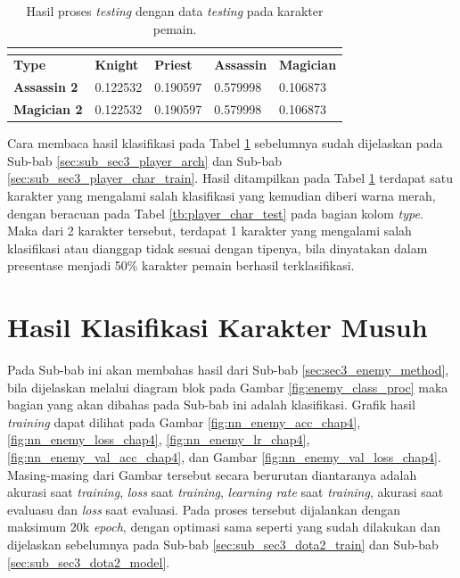 \begin{longtable}{|l|l|l|l|l|}
	\caption{Hasil proses \textit{testing} dengan data \textit{testing} pada karakter pemain.}
	\vspace{1ex}
	\label{tb:player_valid_result}\\
	\hline
	\rowcolor[HTML]{C0C0C0} 
	\textbf{Type} & \textbf{Knight} & \textbf{Priest} & \textbf{Assassin} & \textbf{Magician} \\ \hline
	\textbf{Assassin 2} & 0.122532 & 0.190597 & {\color[HTML]{009901} 0.579998} & 0.106873 \\ \hline
	\textbf{Magician 2} & 0.122532 & 0.190597 & {\color[HTML]{FE0000} 0.579998} & 0.106873 \\ \hline
\end{longtable}
\vspace{1ex}

Cara membaca hasil klasifikasi pada Tabel \ref{tb:player_valid_result} sebelumnya sudah dijelaskan pada Sub-bab \ref{sec:sub_sec3_player_arch} dan Sub-bab \ref{sec:sub_sec3_player_char_train}. Hasil ditampilkan pada Tabel \ref{tb:player_valid_result} terdapat satu karakter yang mengalami salah klasifikasi yang kemudian diberi warna merah, dengan beracuan pada Tabel \ref{tb:player_char_test} pada bagian kolom \textit{type}. Maka dari 2 karakter tersebut, terdapat 1 karakter yang mengalami salah klasifikasi atau dianggap tidak sesuai dengan tipenya, bila dinyatakan dalam presentase menjadi 50\% karakter pemain berhasil terklasifikasi.
\vspace{1ex}

\section{Hasil Klasifikasi Karakter Musuh}
\label{sec:sec4_eval_enemy}
\vspace{1ex}

Pada Sub-bab ini akan membahas hasil dari Sub-bab \ref{sec:sec3_enemy_method}, bila dijelaskan melalui diagram blok pada Gambar \ref{fig:enemy_class_proc} maka bagian yang akan dibahas pada Sub-bab ini adalah klasifikasi. Grafik hasil \textit{training} dapat dilihat pada Gambar \ref{fig:nn_enemy_acc_chap4}, \ref{fig:nn_enemy_loss_chap4}, \ref{fig:nn_enemy_lr_chap4}, \ref{fig:nn_enemy_val_acc_chap4}, dan Gambar \ref{fig:nn_enemy_val_loss_chap4}. Masing-masing dari Gambar tersebut secara berurutan diantaranya adalah akurasi saat \textit{training}, \textit{loss} saat \textit{training}, \textit{learning rate} saat \textit{training}, akurasi saat evaluasu dan \textit{loss} saat evaluasi. Pada proses tersebut dijalankan dengan maksimum 20k \textit{epoch}, dengan optimasi sama seperti yang sudah dilakukan dan dijelaskan sebelumnya pada Sub-bab \ref{sec:sub_sec3_dota2_train} dan Sub-bab \ref{sec:sub_sec3_dota2_model}.
\vspace{1ex}

